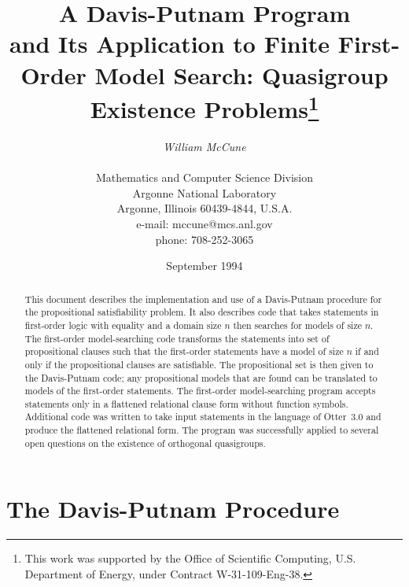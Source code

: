 \setlength{\hoffset}{-.5in}
\setlength{\voffset}{-1in}
\setlength{\parskip}{.1in}
\textwidth=16cm \textheight=23.5cm
\newcommand{\otter}{{\sc Otter}}

\title{{\Large\bf A Davis-Putnam Program \\
and Its Application to
Finite First-Order Model Search:
Quasigroup Existence Problems}\thanks{This work was
supported by the Office of Scientific Computing,
U.S. Department of Energy, under Contract W-31-109-Eng-38.}}
\author{{\it William McCune} \\ \\
Mathematics and Computer Science Division \\
Argonne National Laboratory \\
Argonne, Illinois 60439-4844, U.S.A. \\
e-mail: mccune@mcs.anl.gov \\
phone: 708-252-3065}
\date{September 1994}
\maketitle

\begin{abstract}
This document describes the implementation and use of a Davis-Putnam
procedure for the propositional satisfiability problem.  It also
describes code that takes statements in first-order logic with
equality and a domain size $n$ then searches for models of size $n$.  The
first-order model-searching code transforms the statements into set of
propositional clauses such that the first-order statements have a
model of size $n$ if and only if the propositional clauses are
satisfiable.  The propositional set is then given to the Davis-Putnam
code; any propositional models that are found can be translated to
models of the first-order statements.
The first-order model-searching program accepts statements only in a
flattened relational clause form without function symbols.  Additional
code was written to take input statements in the language of \otter\ 3.0
and produce the flattened relational form.
The program was successfully applied to several open questions
on the existence of orthogonal quasigroups.
\end{abstract}

\section{The Davis-Putnam Procedure}

